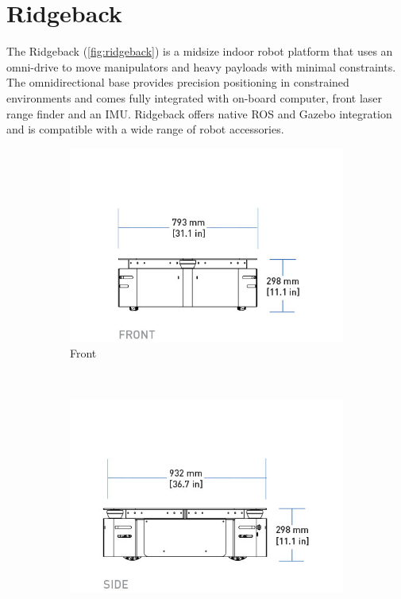 \documentclass[times, utf8, diplomski, english]{fer}
\begin{document}
\section{Ridgeback} 
The Ridgeback (\autoref{fig:ridgeback}) is a midsize indoor robot platform that uses an omni-drive to move manipulators and heavy payloads with minimal constraints. 
The omnidirectional base provides precision positioning in constrained environments and comes fully integrated with on-board computer, front laser range finder and an IMU. 
Ridgeback offers native ROS and Gazebo integration and is compatible with a wide range of robot accessories.
\begin{figure}[h]
    \centering
        \begin{subfigure}[t]{0.34\textwidth}
        \includegraphics[width=\textwidth]{rb_front}
        \caption{Front}
    \end{subfigure}
    ~
    \begin{subfigure}[t]{0.34\textwidth}
        \includegraphics[width=\textwidth]{rb_side}

\end{subfigure}
\end{figure}
\end{document}
